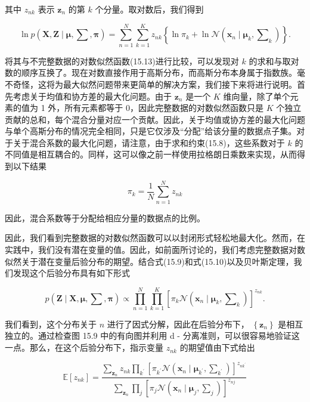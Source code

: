 \documentclass[10pt]{report}
\begin{document}
其中 \({z}_{nk}\) 表示 \({\mathbf{z}}_{n}\) 的第 \(k\) 个分量。取对数后，我们得到

\[
\ln p\left( {\mathbf{X},\mathbf{Z} \mid  \mathbf{\mu },\mathbf{\sum },\mathbf{\pi }}\right)  = \mathop{\sum }\limits_{{n = 1}}^{N}\mathop{\sum }\limits_{{k = 1}}^{K}{z}_{nk}\left\{  {\ln {\pi }_{k} + \ln \mathcal{N}\left( {{\mathbf{x}}_{n} \mid  {\mathbf{\mu }}_{k},{\mathbf{\sum }}_{k}}\right) }\right\}  . \tag{15.26}
\]

将其与不完整数据的对数似然函数(15.13)进行比较，可以发现对 \(k\) 的求和与取对数的顺序互换了。现在对数直接作用于高斯分布，而高斯分布本身属于指数族。毫不奇怪，这将为最大似然问题带来更简单的解决方案，我们接下来将进行说明。首先考虑关于均值和协方差的最大化问题。由于 \({\mathbf{z}}_{n}\) 是一个 \(K\) 维向量，除了单个元素的值为 1 外，所有元素都等于 0，因此完整数据的对数似然函数只是 \(K\) 个独立贡献的总和，每个混合分量对应一个贡献。因此，关于均值或协方差的最大化问题与单个高斯分布的情况完全相同，只是它仅涉及“分配”给该分量的数据点子集。对于关于混合系数的最大化问题，请注意，由于求和约束(15.8)，这些系数对于 \(k\) 的不同值是相互耦合的。同样，这可以像之前一样使用拉格朗日乘数来实现，从而得到以下结果

\[
{\pi }_{k} = \frac{1}{N}\mathop{\sum }\limits_{{n = 1}}^{N}{z}_{nk} \tag{15.27}
\]

因此，混合系数等于分配给相应分量的数据点的比例。

因此，我们看到完整数据的对数似然函数可以以封闭形式轻松地最大化。然而，在实践中，我们没有潜在变量的值。因此，如前面所讨论的，我们考虑完整数据对数似然关于潜在变量后验分布的期望。结合式(15.9)和式(15.10)以及贝叶斯定理，我们发现这个后验分布具有如下形式

\[
p\left( {\mathbf{Z} \mid  \mathbf{X},\mathbf{\mu },\mathbf{\sum },\mathbf{\pi }}\right)  \propto  \mathop{\prod }\limits_{{n = 1}}^{N}\mathop{\prod }\limits_{{k = 1}}^{K}{\left\lbrack  {\pi }_{k}\mathcal{N}\left( {\mathbf{x}}_{n} \mid  {\mathbf{\mu }}_{k},{\mathbf{\sum }}_{k}\right) \right\rbrack  }^{{z}_{nk}}. \tag{15.28}
\]

我们看到，这个分布关于 \(n\) 进行了因式分解，因此在后验分布下， \(\left\{  {\mathbf{z}}_{n}\right\}\) 是相互独立的。通过检查图 15.9 中的有向图并利用 d - 分离准则，可以很容易地验证这一点。那么，在这个后验分布下，指示变量 \({z}_{nk}\) 的期望值由下式给出

\[
\mathbb{E}\left\lbrack  {z}_{nk}\right\rbrack   = \frac{\mathop{\sum }\limits_{{\mathbf{z}}_{n}}{z}_{nk}\mathop{\prod }\limits_{{k}^{\prime }}{\left\lbrack  {\pi }_{{k}^{\prime }}\mathcal{N}\left( {\mathbf{x}}_{n} \mid  {\mathbf{\mu }}_{{k}^{\prime }},{\mathbf{\sum }}_{{k}^{\prime }}\right) \right\rbrack  }^{{z}_{n{k}^{\prime }}}}{\mathop{\sum }\limits_{{\mathbf{z}}_{n}}\mathop{\prod }\limits_{j}{\left\lbrack  {\pi }_{j}\mathcal{N}\left( {\mathbf{x}}_{n} \mid  {\mathbf{\mu }}_{j},{\mathbf{\sum }}_{j}\right) \right\rbrack  }^{{z}_{nj}}}
\]
\end{document}
